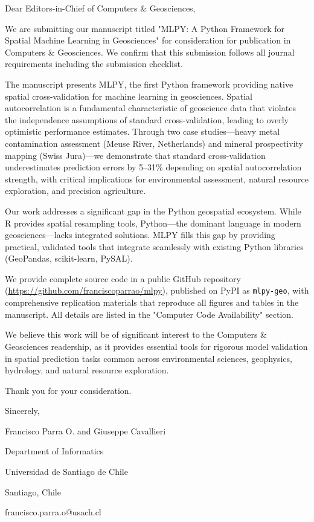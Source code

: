 \documentclass[a4paper,fleqn]{cas-sc}
\begin{document}
\begin{coverletter}

Dear Editors-in-Chief of Computers \& Geosciences,

We are submitting our manuscript titled "MLPY: A Python Framework for Spatial Machine Learning in Geosciences" for consideration for publication in Computers \& Geosciences. We confirm that this submission follows all journal requirements including the submission checklist.

The manuscript presents MLPY, the first Python framework providing native spatial cross-validation for machine learning in geosciences. Spatial autocorrelation is a fundamental characteristic of geoscience data that violates the independence assumptions of standard cross-validation, leading to overly optimistic performance estimates. Through two case studies---heavy metal contamination assessment (Meuse River, Netherlands) and mineral prospectivity mapping (Swiss Jura)---we demonstrate that standard cross-validation underestimates prediction errors by 5--31\% depending on spatial autocorrelation strength, with critical implications for environmental assessment, natural resource exploration, and precision agriculture.

Our work addresses a significant gap in the Python geospatial ecosystem. While R provides spatial resampling tools, Python---the dominant language in modern geosciences---lacks integrated solutions. MLPY fills this gap by providing practical, validated tools that integrate seamlessly with existing Python libraries (GeoPandas, scikit-learn, PySAL).

We provide complete source code in a public GitHub repository (\url{https://github.com/franciscoparrao/mlpy}), published on PyPI as \texttt{mlpy-geo}, with comprehensive replication materials that reproduce all figures and tables in the manuscript. All details are listed in the "Computer Code Availability" section.

We believe this work will be of significant interest to the Computers \& Geosciences readership, as it provides essential tools for rigorous model validation in spatial prediction tasks common across environmental sciences, geophysics, hydrology, and natural resource exploration.

Thank you for your consideration.

Sincerely,

Francisco Parra O. and Giuseppe Cavallieri

Department of Informatics

Universidad de Santiago de Chile

Santiago, Chile

francisco.parra.o@usach.cl

\end{coverletter}
\end{document}
